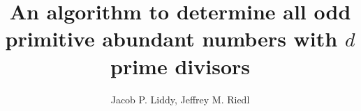 \documentclass[12pt]{article}
\title{An algorithm to determine all odd primitive abundant
numbers with $d$ prime divisors}
\author{Jacob P. Liddy, Jeffrey M. Riedl}
\numberwithin{theorem}{section}
\numberwithin{coro}{section}
\begin{document}
\maketitle












\cite{dickson}


\end{document}
